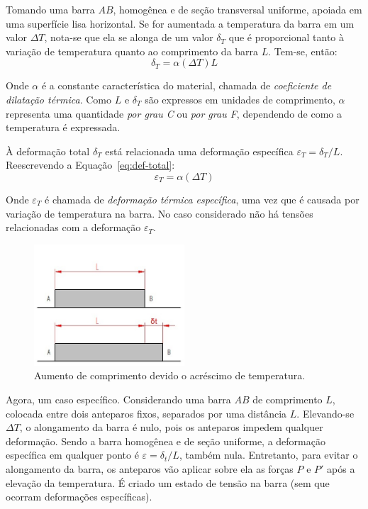 Tomando uma barra $AB$, homogênea e de seção transversal uniforme, apoiada em uma superfície lisa horizontal. Se for aumentada a temperatura da barra em um valor $\Delta T$, nota-se que ela se alonga de um valor $\delta_T$ que é proporcional tanto à variação de temperatura quanto ao comprimento da barra $L$. Tem-se, então:
\begin{equation}\label{eq:def-total}
	\delta_T=\alpha(\Delta T)L
\end{equation}

Onde $\alpha$ é a constante característica do material, chamada de \textit{coeficiente de dilatação térmica}. Como $L$ e $\delta_T$ são expressos em unidades de comprimento, $\alpha$ representa uma quantidade \textit{por grau C} ou \textit{por grau F}, dependendo de como a temperatura é expressada.

À deformação total $\delta_T$ está relacionada uma deformação específica $\varepsilon_T=\delta_T/L$. Reescrevendo a Equação~\eqref{eq:def-total}:
\begin{equation}
	\varepsilon_T=\alpha(\Delta T)
\end{equation}

Onde $\varepsilon_T$ é chamada de \textit{deformação térmica específica}, uma vez que é causada por variação de temperatura na barra. No caso considerado não há tensões relacionadas com a deformação $\varepsilon_T$.

\begin{figure}[H]
	\begin{center}
	\caption{Aumento de comprimento devido o acréscimo de temperatura.}
    	\includegraphics[width=0.5\textwidth]{Resistencia-dos-materiais/Imagens/Variacao-de-temperatura.jpg}
	\end{center}
\end{figure}

Agora, um caso específico. Considerando uma barra $AB$ de comprimento $L$, colocada entre dois anteparos fixos, separados por uma distância $L$. Elevando-se $\Delta T$, o alongamento da barra é nulo, pois os anteparos impedem qualquer deformação. Sendo a barra homogênea e de seção uniforme, a deformação específica em qualquer ponto é $\varepsilon=\delta_t/L$, também nula. Entretanto, para evitar o alongamento da barra, os anteparos vão aplicar sobre ela as forças $P$ e $P'$ após a elevação da temperatura. É criado um estado de tensão na barra (sem que ocorram deformações específicas).

